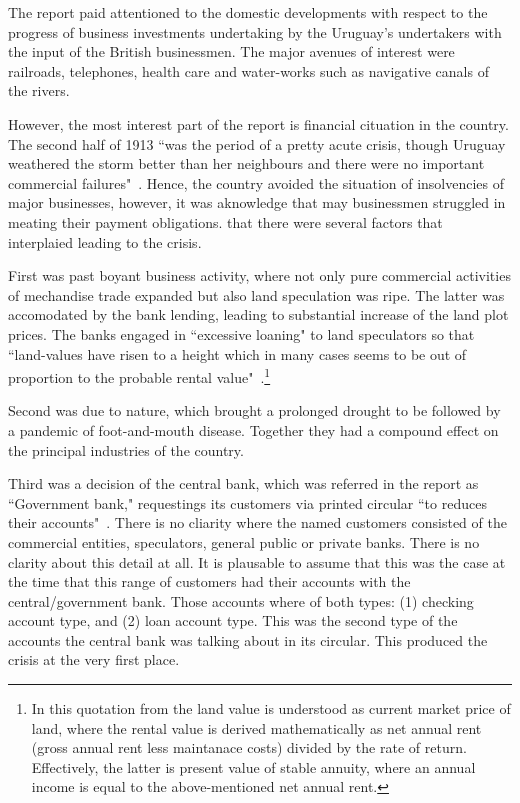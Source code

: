 The report paid attentioned to the domestic developments with respect to the progress of business investments undertaking by the Uruguay's undertakers with the input of the British businessmen. The major avenues of interest were railroads, telephones, health care and water-works such as navigative canals of the rivers. 

However, the most interest part of the report is financial cituation in the country. The second half of 1913 ``was the period of a pretty acute crisis, though Uruguay weathered the storm better than her neighbours and there were no important commercial failures"~\citep[p.~6]{innes1914a}. Hence, the country avoided the situation of insolvencies of major businesses, however, it was aknowledge that may businessmen struggled in meating their payment obligations. \citeauthor{innes1914a} that there were several factors that interplaied leading to the crisis. 

First was past boyant business activity, where not only pure commercial activities of mechandise trade expanded but also land speculation was ripe. The latter was accomodated by the bank lending, leading to substantial increase of the land plot prices. The banks engaged in ``excessive loaning" to land speculators so that ``land-values have risen to a height which in many cases seems to be out of proportion to the probable rental value"~\citep[p.~7]{innes1914a}.\footnote{In this quotation from \citep[p.~7]{innes1914a} the land value is understood as current market price of land, where the rental value is derived mathematically as net annual rent (gross annual rent less maintanace costs) divided by the rate of return. Effectively, the latter is present value of stable annuity, where an annual income is equal to the above-mentioned net annual rent.}

Second was due to nature, which brought a prolonged drought to be followed by a pandemic of foot-and-mouth disease. Together they had a compound effect on the principal industries of the country.

Third was a decision of the central bank, which was referred in the report as ``Government bank," requestings its customers via printed circular ``to reduces their accounts"~\citep[p.~7]{innes1914a}. There is no cliarity where the named customers consisted of the commercial entities, speculators, general public or private banks. There is no clarity about this detail at all. It is plausable to assume that this was the case at the time that this range of customers had their accounts with the central/government bank. Those accounts where of both types: (1) checking account type, and (2) loan account type. This was the second type of the accounts the central bank was talking about in its circular. This produced the crisis at the very first place. 


